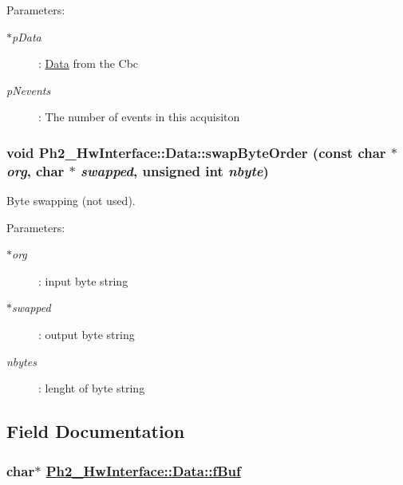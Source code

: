 \begin{Desc}
\item[Parameters:]
\begin{description}
\item[{\em $\ast$p\-Data}]: \hyperlink{class_ph2___hw_interface_1_1_data}{Data} from the Cbc \item[{\em p\-Nevents}]: The number of events in this acquisiton \end{description}
\end{Desc}
\hypertarget{class_ph2___hw_interface_1_1_data_91b7bafc8b47251b022aab16e19fa722}{
\subsubsection[swapByteOrder]{\setlength{\rightskip}{0pt plus 5cm}void Ph2\_\-Hw\-Interface::Data::swap\-Byte\-Order (const char $\ast$ {\em org}, char $\ast$ {\em swapped}, unsigned int {\em nbyte})}}
\label{class_ph2___hw_interface_1_1_data_91b7bafc8b47251b022aab16e19fa722}


Byte swapping (not used). 

\begin{Desc}
\item[Parameters:]
\begin{description}
\item[{\em $\ast$org}]: input byte string \item[{\em $\ast$swapped}]: output byte string \item[{\em nbytes}]: lenght of byte string \end{description}
\end{Desc}


\subsection{Field Documentation}
\hypertarget{class_ph2___hw_interface_1_1_data_cf647e64b2febe8555e7b044e5cfc98d}{
\subsubsection[fBuf]{\setlength{\rightskip}{0pt plus 5cm}char$\ast$ \hyperlink{class_ph2___hw_interface_1_1_data_cf647e64b2febe8555e7b044e5cfc98d}{Ph2\_\-Hw\-Interface::Data::f\-Buf}}}
\label{class_ph2___hw_interface_1_1_data_cf647e64b2febe8555e7b044e5cfc98d}


